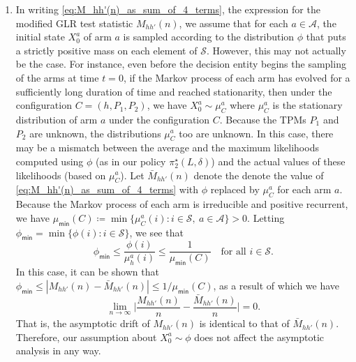 \begin{enumerate}
	\item In writing \eqref{eq:M_hh'(n)_as_sum_of_4_terms}, the expression for the modified GLR test statistic $M_{hh'}(n)$, we assume that for each $a\in \mathcal{A}$, the initial state $X_0^a$ of arm $a$ is sampled according to the distribution $\phi$ that puts a strictly positive mass on each element of $\mathcal{S}$. However, this may not actually be the case. For instance, even before the decision entity begins the sampling of the arms at time $t=0$, if the Markov process of each arm has evolved for a sufficiently long duration of time and reached stationarity, then under the configuration $C=(h, P_1, P_2)$, we have $X_0^a\sim \mu_C^a$ where $\mu_C^a$ is the stationary distribution of arm $a$ under the configuration $C$. Because the TPMs $P_1$ and $P_2$ are unknown, the distributions $\mu_C^a$ too are unknown. In this case, there may be a mismatch between the average and the maximum likelihoods computed using $\phi$ (as in our policy $\pi_2^\star(L, \delta)$) and the actual values of these likelihoods (based on $\mu_C^a$). Let $\bar{M}_{hh'}(n)$ denote the denote the value of \eqref{eq:M_hh'(n)_as_sum_of_4_terms} with $\phi$ replaced by $\mu_C^a$ for each arm $a$. Because the Markov process of each arm is irreducible and positive recurrent, we have $\mu_{\textsf{min}}(C)\coloneqq\min\{\mu_C^a(i):i\in \mathcal{S}, ~a\in \mathcal{A}\}>0$. Letting $\phi_{\textsf{min}}=\min\{\phi(i):i\in \mathcal{S}\}$, we see that $$ \phi_{\textsf{min}}\leq \frac{\phi(i)}{\mu_h^a(i)}\leq \frac{1}{\mu_{\textsf{min}}(C)}\quad \text{for all }i\in \mathcal{S}.  $$ In this case, it can be shown that $\phi_{\textsf{min}}\leq |M_{hh'}(n)-\bar{M}_{hh'}(n)|\leq 1/\mu_{\textsf{min}}(C)$, as a result of which we have $$\lim\limits_{n\to\infty} \bigg|\frac{M_{hh'}(n)}{n} - \frac{\bar{M}_{hh'}(n)}{n}\bigg|=0.$$ That is, the asymptotic drift of $M_{hh'}(n)$ is identical to that of $\bar{M}_{hh'}(n)$. Therefore, our assumption about $X_0^a\sim \phi$ does not affect the asymptotic analysis in any way.
\end{enumerate}














